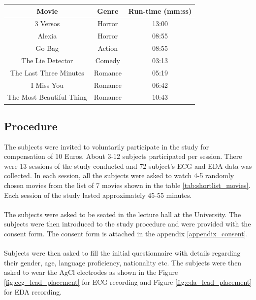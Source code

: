 \begin{center}
\begin{tabular}{ |c|c|c| }
\hline
\textbf{Movie} & \textbf{Genre} & \textbf{Run-time (mm:ss)} \\
\hline
\hline
3 Versos & Horror & 13:00 \\
\hline
Alexia & Horror & 08:55 \\
\hline
Go Bag & Action & 08:55 \\
\hline
The Lie Detector & Comedy & 03:13 \\
\hline
The Last Three Minutes & Romance & 05:19 \\
\hline
I Miss You & Romance & 06:42 \\
\hline
The Most Beautiful Thing & Romance & 10:43 \\
\hline
\end{tabular}
\label{tab:shortlist_movies}
\end{center}

\subsection{Procedure}
\label{sec:procedure}
The subjects were invited to voluntarily participate in the study for compensation of 10 Euros. About 3-12 subjects participated per session. There were 13 sessions of the study conducted and 72 subject's ECG and EDA data was collected. In each session, all the subjects were asked to watch 4-5 randomly chosen movies from the list of 7 movies shown in the table \ref{tab:shortlist_movies}. Each session of the study lasted approximately 45-55 minutes.
\paragraph{}
The subjects were asked to be seated in the lecture hall at the University. The subjects were then introduced to the study procedure and were provided with the consent form. The consent form is attached in the appendix \ref{appendix_consent}.
\paragraph{}
Subjects were then asked to fill the initial questionnaire with details regarding their gender, age, language proficiency, nationality etc. The subjects were then asked to wear the AgCl electrodes as shown in the Figure \ref{fig:ecg_lead_placement} for ECG recording and Figure \ref{fig:eda_lead_placement} for EDA recording.
